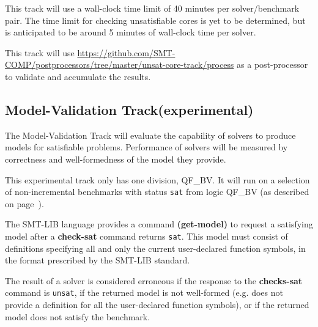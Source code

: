 \documentclass[12pt]{article}
\newcommand{\akey}[1]{\textbf{#1}\xspace}
\newcommand{\mvaltrack}{Model-Validation Track\xspace}
\begin{document}
This track will use a wall-clock time limit of 40 minutes per solver/benchmark
pair. The time limit for checking unsatisfiable cores is yet to be determined,
but is anticipated to be around 5 minutes of wall-clock time per solver.

This track will use
{\url{https://github.com/SMT-COMP/postprocessors/tree/master/unsat-core-track/process}}
as a post-processor
to validate and accumulate the results.

\subsection{\mvaltrack (experimental)}
\label{sec:exec:model}
The \mvaltrack will evaluate the capability of solvers to produce models for
satisfiable problems.  Performance of solvers will be measured by correctness
and well-formedness of the model they provide.

This experimental track only has one division, QF\_BV. It will run on a
selection of non-incremental benchmarks with status \texttt{sat} from logic
QF\_BV (as described on page~\pageref{benchmark-selection}).

The SMT-LIB language provides a command \akey{(get-model)} to request a
satisfying model after a \akey{check-sat} command returns \texttt{sat}.  This
model must consist of definitions specifying all and only the current
user-declared function symbols, in the format prescribed by the SMT-LIB
standard.

The result of a solver is considered erroneous if the response to the
\akey{checks-sat} command is \texttt{unsat}, if the returned model is not
well-formed (e.g. does not provide a definition for all the user-declared
function symbols), or if the returned model does not satisfy the benchmark.
\end{document}

